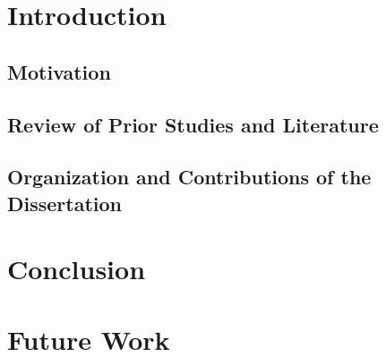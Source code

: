 \documentclass[openany]{nckuthesis}
\begin{document}
\frontmatter
\makecover
\setcounter{page}{0}
\thispagestyle{empty}




\newpage
\tableofcontents
{}
\newpage
\listoffigures
{}
\newpage
\listoftables
{}

\mainmatter

\chapter{Introduction}

\section{Motivation}




\section{Review of Prior Studies and Literature}


\section{Organization and Contributions of the Dissertation}



\chapter{Conclusion}


\chapter{Future Work} \label{chap:future_work}

\appendix

\backmatter
{}
{}
% 



\end{document}
